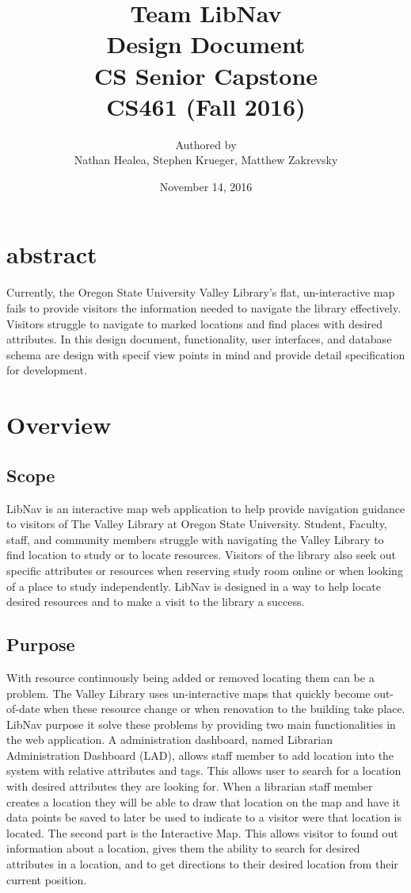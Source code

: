 \documentclass[letterpaper,10pt,titlepage, onecolumn, compsoc]{IEEEtran}
\title{Team LibNav \\ Design Document \\ CS Senior Capstone \\ \vspace{2mm}\small CS461 (Fall 2016)}
\author{Authored by \\ Nathan Healea, Stephen Krueger, Matthew Zakrevsky}
\date{November 14, 2016}
\begin{document}
\maketitle

\section*{abstract}
Currently, the Oregon State University Valley Library's flat, un-interactive map fails to provide visitors the information needed to navigate the library effectively. Visitors struggle to navigate to marked locations and find places with desired attributes. In this design document, functionality, user interfaces, and database schema are design with specif view points in mind and provide detail specification for development.
\newpage

\tableofcontents
\newpage

\section{Overview}

\subsection{Scope}
LibNav is an interactive map web application to help provide navigation guidance to visitors of The Valley Library at Oregon State University. Student, Faculty, staff, and community members struggle with navigating the Valley Library to find location to study or to locate resources.  Visitors of the library also seek out specific attributes or resources when reserving study room online or when looking of a place to study independently. LibNav is designed in a way to help locate desired resources and to make a visit to the library a success.

\subsection{Purpose}
With resource continuously being added or removed locating them can be a problem. The Valley Library uses un-interactive maps that quickly become out-of-date when these resource change or when renovation to the building take place. LibNav purpose it solve these problems by providing two main functionalities in the web application. A administration dashboard, named Librarian Administration Dashboard (LAD), allows staff member to add location into the system with relative attributes and tags. This allows user to search for a location with desired attributes they are looking for. When a librarian staff member creates a location they will be able to draw that location on the map and have it data points be saved to later be used to indicate to a visitor were that location is located.  The second part is the Interactive Map. This allows visitor to found out information about a location, gives them the ability to search for desired attributes in a location, and to get directions to their desired location from their current position.  
\end{document}
